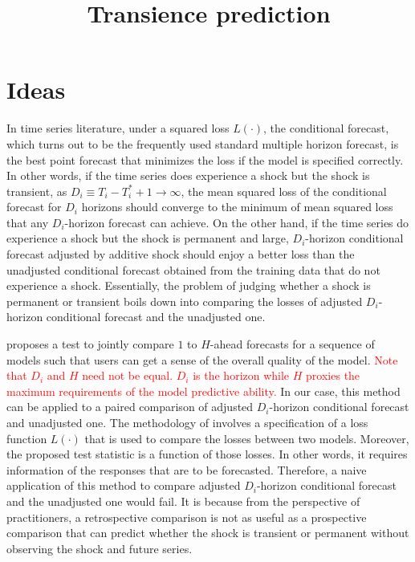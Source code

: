 \documentclass[12pt]{article}
\title{Transience prediction}
\theoremstyle{definition}
\theoremstyle{definition}
\begin{document}
\maketitle

  
\section{Ideas}

In time series literature, under a squared loss $L(\cdot)$, the conditional forecast, which turns out to be the frequently used standard  multiple horizon forecast, is the best point forecast that minimizes the loss if the model is specified correctly. In other words, if the time series does experience a shock but the shock is transient, as $D_i\equiv T_i-T_i^*+1\to \infty$, the mean squared loss of the conditional forecast for $D_i$ horizons should converge to the minimum of mean squared loss that  any $D_i$-horizon forecast can achieve.  On the other hand, if the time series do experience a shock but the shock is permanent and large, $D_i$-horizon conditional forecast adjusted by additive shock should enjoy a better loss than the unadjusted conditional forecast obtained from the training data that do not experience a shock. Essentially, the problem of judging whether a shock is permanent or transient boils down into comparing  the losses of adjusted $D_i$-horizon conditional forecast and the unadjusted one.

\cite{quaedvlieg2021multi} proposes  a test to jointly compare $1$ to $H$-ahead forecasts 
 for a  sequence of models such that users can get a sense of the overall quality of the model. \textcolor{red}{Note that $D_i$ and $H$ need not be equal. $D_i$ is the horizon while $H$ proxies the maximum requirements of the model predictive ability.} In our case, this method can be applied to a paired comparison of adjusted $D_i$-horizon conditional forecast and unadjusted one. The methodology of \cite{quaedvlieg2021multi} involves a specification of a loss function $L(\cdot)$ that is used to compare the losses between two models. Moreover, the proposed test statistic is a function of those losses. In other words, it requires information of the responses that are to be forecasted. Therefore, a naive application of this method to compare adjusted $D_i$-horizon conditional forecast and the unadjusted one would fail. It is because from the perspective of practitioners, a retrospective comparison is not as useful as a prospective comparison that can predict whether the shock is transient or permanent without observing the shock and future series.
\end{document}

